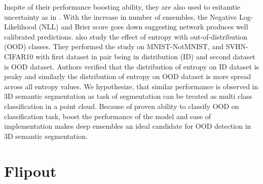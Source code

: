 Inspite of their performance boosting ability, they are also used to esitamtie uncertainty as in \cite{lakshminarayanan2016simple}.
With the increase in number of ensembles, the Negative Log-Likelihood (NLL) and Brier score goes down suggesting network produces well calibrated predictions.
\cite{lakshminarayanan2016simple} also study the effect of entropy with out-of-distribution (OOD) classes.
They performed the study on MNIST-NotMNIST, and SVHN-CIFAR10 with first dataset in pair being in distribution (ID) and second dataset is OOD dataset.
Authors verified that the distribution of entropy on ID dataset is peaky and similarly the distribution of entropy on OOD dataset is more spread across all entropy values.
We hypothesize, that similar performance is observed in 3D semantic segmentation as task of segmentation can be treated as multi class classification in a point cloud.
Because of proven ability to classify OOD on classification task, boost the performance of the model and ease of implementation makes deep ensembles an ideal candidate for OOD detection in 3D semantic segmentation.

\section{Flipout}



